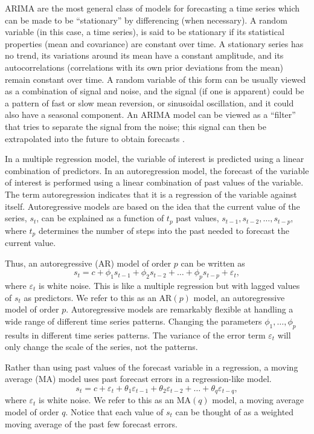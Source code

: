 ARIMA are the most general class of models for forecasting a time series which can be made to be ``stationary'' by differencing (when necessary). A random variable (in this case, a time series), is said to be stationary if its statistical properties (mean and covariance) are constant over time.  A stationary series has no trend, its variations around its mean have a constant amplitude, and its autocorrelations (correlations with its own prior deviations from the mean) remain constant over time.  A random variable of this form can be usually viewed as a combination of signal and noise, and the signal (if one is apparent) could be a pattern of fast or slow mean reversion, or sinusoidal oscillation, %
and it could also have a seasonal component. An ARIMA model can be viewed as a ``filter'' that tries to separate the signal from the noise; this signal can then be extrapolated into the future to obtain forecasts \cite{Chatfield2019}.

In a multiple regression model, the variable of interest is predicted using a linear combination of predictors. In an autoregression model, the forecast of the variable of interest is performed using a linear combination of past values of the variable. The term autoregression indicates that it is a regression of the variable against itself. Autoregressive models are based on the idea that the current value of the series, $s_{t}$, can be explained as a function of $t_{p}$ past values, $s_{t-1}, s_{t-2}, \ldots, s_{t-p}$, where $t_{p}$ determines the number of steps into the past needed to forecast the current value. 

Thus, an autoregressive (AR) model of order $p$ can be written as 
\begin{equation}
    \label{Eq:AR_p}
    s_{t} = c + \phi_{1} s_{t-1} + \phi_{2} s_{t-2} + \ldots +\phi_{p}s_{t-p} + \varepsilon_{t},
\end{equation} where $\varepsilon_{t}$ is white noise. This is like a multiple regression but with lagged values of $s_{t}$ as predictors. We refer to this as an AR$(p)$ model, an autoregressive model of order $p$. Autoregressive models are remarkably flexible at handling a wide range of different time series patterns. Changing the parameters $\phi_{1},\ldots, \phi_{p}$ results in different time series patterns. The variance of the error term $\varepsilon_{t}$ will only change the scale of the series, not the patterns.

Rather than using past values of the forecast variable in a regression, a moving average (MA) model uses past forecast errors in a regression-like model. 
\begin{equation}
    \label{Eq:MA_q}
    s_{t} = c + \varepsilon_{t} + \theta_{1} \varepsilon_{t-1} + \theta_{2}\varepsilon_{t-2} + \ldots + \theta_{q} \varepsilon_{t-q},    
\end{equation}
 where $\varepsilon_{t}$ is white noise. We refer to this as an MA$(q)$ model, a moving average model of order $q$. Notice that each value of $s_{t}$ can be thought of as a weighted moving average of the past few forecast errors.

